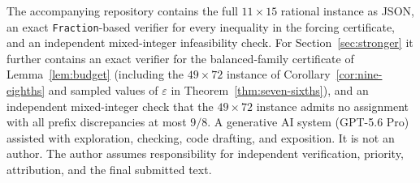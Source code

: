 \documentclass[11pt]{article}
\theoremstyle{definition}
\newcommand{\eps}{\varepsilon}
\begin{document}
The accompanying repository contains the full $11\times15$ rational instance
as JSON, an exact \texttt{Fraction}-based verifier for every inequality in the
forcing certificate, and an independent mixed-integer infeasibility check.
For Section~\ref{sec:stronger} it further contains an exact verifier for the
balanced-family certificate of Lemma~\ref{lem:budget} (including the
$49\times72$ instance of Corollary~\ref{cor:nine-eighths} and sampled values
of $\eps$ in Theorem~\ref{thm:seven-sixths}), and an independent
mixed-integer check that the $49\times72$ instance admits no assignment with
all prefix discrepancies at most $9/8$.
A generative AI system (GPT-5.6 Pro) assisted with exploration, checking,
code drafting, and exposition.  It is not an author.  The author assumes
responsibility for independent verification, priority, attribution, and the
final submitted text.



\end{document}
